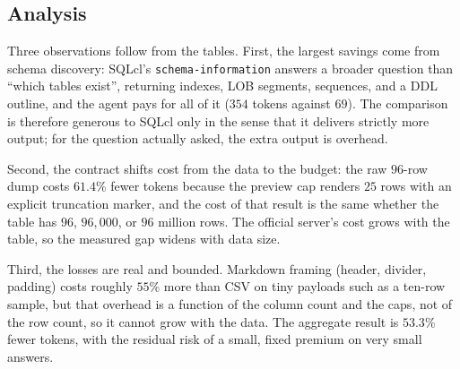 \subsection{Analysis}

Three observations follow from the tables. First, the largest savings come from schema discovery: SQLcl's \texttt{schema-information} answers a broader question than ``which tables exist'', returning indexes, LOB segments, sequences, and a DDL outline, and the agent pays for all of it ($354$ tokens against $69$). The comparison is therefore generous to SQLcl only in the sense that it delivers strictly more output; for the question actually asked, the extra output is overhead.

Second, the contract shifts cost from the data to the budget: the raw $96$-row dump costs $61.4$\% fewer tokens because the preview cap renders $25$ rows with an explicit truncation marker, and the cost of that result is the same whether the table has $96$, $96{,}000$, or $96$ million rows. The official server's cost grows with the table, so the measured gap widens with data size.

Third, the losses are real and bounded. Markdown framing (header, divider, padding) costs roughly $55$\% more than CSV on tiny payloads such as a ten-row sample, but that overhead is a function of the column count and the caps, not of the row count, so it cannot grow with the data. The aggregate result is $53.3$\% fewer tokens, with the residual risk of a small, fixed premium on very small answers.
